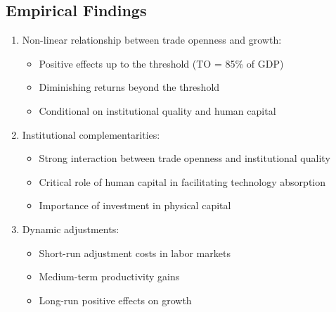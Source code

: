\documentclass[12pt,a4paper]{article}
\theoremstyle{definition}
\begin{document}
\subsection{Empirical Findings}
\begin{enumerate}
    \item Non-linear relationship between trade openness and growth:
    \begin{itemize}
        \item Positive effects up to the threshold (TO = 85\% of GDP)
        \item Diminishing returns beyond the threshold
        \item Conditional on institutional quality and human capital
    \end{itemize}
    
    \item Institutional complementarities:
    \begin{itemize}
        \item Strong interaction between trade openness and institutional quality
        \item Critical role of human capital in facilitating technology absorption
        \item Importance of investment in physical capital
    \end{itemize}
    
    \item Dynamic adjustments:
    \begin{itemize}
        \item Short-run adjustment costs in labor markets
        \item Medium-term productivity gains
        \item Long-run positive effects on growth
    \end{itemize}
\end{enumerate}
\end{document}
